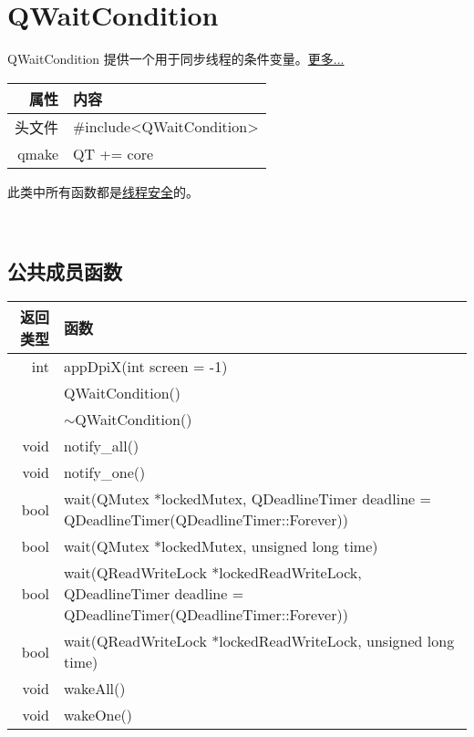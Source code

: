 \chapter{QWaitCondition}

QWaitCondition 提供一个用于同步线程的条件变量。\href{https://github.com/QtDocumentCN/QtDocumentCN/blob/master/Src/W/QWaitCondition/QWaitCondition.md#%E8%AF%A6%E7%BB%86%E6%8F%8F%E8%BF%B0}{更多...} 
	
\begin{tabular}{|r|l|}
	\hline
	属性 & 内容 \\
	\hline
	头文件 & \#include<QWaitCondition>\\      
	\hline
	qmake & QT += core\\      
	\hline
\end{tabular}

\begin{notice}
	此类中所有函数都是\href{https://github.com/QtDocumentCN/QtDocumentCN/blob/master/Src/R/Reentrancy_and_Thread-Safety/Reentrancy_and_Thread-Safety.md}{线程安全}的。
\end{notice}

 	
\section{公共成员函数}

\begin{tabular}{|r|l|}
	\hline
	返回类型 & 函数 \\
	\hline
	int	& appDpiX(int screen = -1)\\
	\hline
	&QWaitCondition()\\
	\hline
	& $\sim$QWaitCondition()\\
	\hline
	void &	notify\_all()\\
	\hline
	void	&notify\_one()\\
		\hline
	bool&	wait(QMutex *lockedMutex, QDeadlineTimer deadline = QDeadlineTimer(QDeadlineTimer::Forever)) \\
	\hline
	bool &	wait(QMutex *lockedMutex, unsigned long time) \\
	\hline
	bool&	wait(QReadWriteLock *lockedReadWriteLock, QDeadlineTimer deadline = QDeadlineTimer(QDeadlineTimer::Forever)) \\
	\hline
	bool &	wait(QReadWriteLock *lockedReadWriteLock, unsigned long time) \\
	void &	wakeAll()\\
	\hline
	void &	wakeOne()\\
	\hline
\end{tabular}

